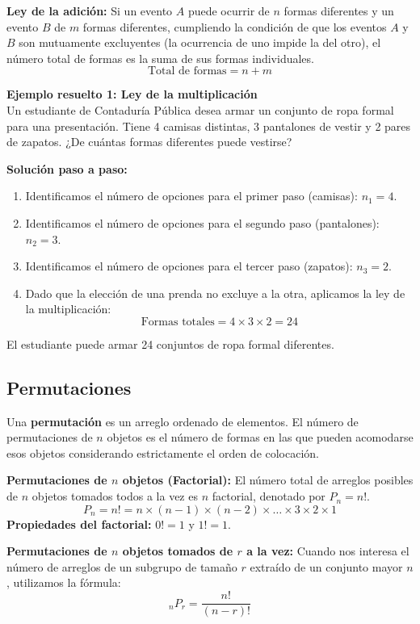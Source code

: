 \documentclass[12pt,a4paper]{article}
\begin{document}
\textbf{Ley de la adición:} Si un evento $A$ puede ocurrir de $n$ formas diferentes y un evento $B$ de $m$ formas diferentes, cumpliendo la condición de que los eventos $A$ y $B$ son mutuamente excluyentes (la ocurrencia de uno impide la del otro), el número total de formas es la suma de sus formas individuales.
\[
\text{Total de formas} = n + m
\]

\vspace{0.5cm}
\textbf{Ejemplo resuelto 1: Ley de la multiplicación} \\
Un estudiante de Contaduría Pública desea armar un conjunto de ropa formal para una presentación. Tiene 4 camisas distintas, 3 pantalones de vestir y 2 pares de zapatos. ¿De cuántas formas diferentes puede vestirse?

\textbf{Solución paso a paso:}
\begin{enumerate}[noitemsep]
    \item Identificamos el número de opciones para el primer paso (camisas): $n_{1} = 4$.
    \item Identificamos el número de opciones para el segundo paso (pantalones): $n_{2} = 3$.
    \item Identificamos el número de opciones para el tercer paso (zapatos): $n_{3} = 2$.
    \item Dado que la elección de una prenda no excluye a la otra, aplicamos la ley de la multiplicación:
    \[
    \text{Formas totales} = 4 \times 3 \times 2 = 24
    \]
\end{enumerate}
El estudiante puede armar 24 conjuntos de ropa formal diferentes.

\subsection{Permutaciones}
Una \textbf{permutación} es un arreglo ordenado de elementos. El número de permutaciones de $n$ objetos es el número de formas en las que pueden acomodarse esos objetos considerando estrictamente el orden de colocación.

\textbf{Permutaciones de $n$ objetos (Factorial):} El número total de arreglos posibles de $n$ objetos tomados todos a la vez es $n$ factorial, denotado por $P_{n} = n!$.
\[
P_{n} = n! = n \times (n-1) \times (n-2) \times \dots \times 3 \times 2 \times 1
\]
\textbf{Propiedades del factorial:} $0! = 1$ y $1! = 1$.

\textbf{Permutaciones de $n$ objetos tomados de $r$ a la vez:} Cuando nos interesa el número de arreglos de un subgrupo de tamaño $r$ extraído de un conjunto mayor $n$, utilizamos la fórmula:
\[
_{n}P_{r} = \frac{n!}{(n-r)!}
\]
\end{document}
